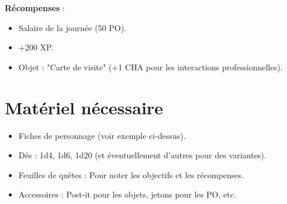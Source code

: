 \documentclass[11pt, a4paper]{article}
\begin{document}
\textbf{Récompenses} :
\begin{itemize}
    \item Salaire de la journée (50 PO).
    \item +200 XP.
    \item Objet : "Carte de visite" (+1 CHA pour les interactions professionnelles).
\end{itemize}

\section{Matériel nécessaire}
\begin{itemize}
    \item Fiches de personnage (voir exemple ci-dessus).
    \item Dés : 1d4, 1d6, 1d20 (et éventuellement d'autres pour des variantes).
    \item Feuilles de quêtes : Pour noter les objectifs et les récompenses.
    \item Accessoires : Post-it pour les objets, jetons pour les PO, etc.
\end{itemize}
\end{document}
